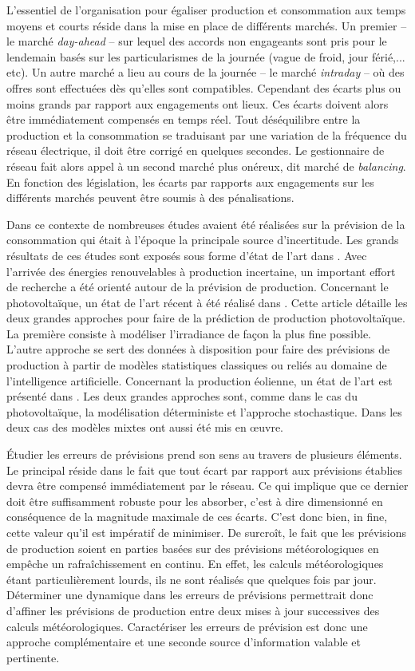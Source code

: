 \documentclass[12pt]{report}
\begin{document}
L'essentiel de l'organisation pour égaliser production et consommation aux temps moyens et courts réside dans la mise en place de différents marchés. Un premier -- le marché \textit{day-ahead} -- sur lequel des accords non engageants sont pris pour le lendemain basés sur les particularismes de la journée (vague de froid, jour férié,... etc). Un autre marché a lieu au cours de la journée -- le marché \textit{intraday} -- où des offres sont effectuées dès qu'elles sont compatibles. Cependant des écarts plus ou moins grands par rapport aux engagements ont lieux. Ces écarts doivent alors être immédiatement compensés en temps réel. Tout déséquilibre entre la production et la consommation se traduisant par une variation de la fréquence du réseau électrique, il doit être corrigé en quelques secondes. Le gestionnaire de réseau fait alors appel à un second marché plus onéreux, dit marché de \textit{balancing}. En fonction des législation, les écarts par rapports aux engagements sur les différents marchés peuvent être soumis à des pénalisations.

Dans ce contexte de nombreuses études avaient été réalisées sur la prévision de la consommation qui était à l'époque la principale source d'incertitude. Les grands résultats de ces études sont exposés sous forme d'état de l'art dans \cite{suganthi_Energy_2012}. Avec l'arrivée des énergies renouvelables à production incertaine, un important effort de recherche a été orienté autour de la prévision de production. Concernant le photovoltaïque, un état de l'art récent à été réalisé dans \cite{antonanzas_review_2016}. Cette article détaille les deux grandes approches pour faire de la prédiction de production photovoltaïque. La première consiste à modéliser l'irradiance de façon la plus fine possible. L'autre approche se sert des données à disposition pour faire des prévisions de production à partir de modèles statistiques classiques ou reliés au domaine de l'intelligence artificielle. Concernant la production éolienne, un état de l'art est présenté dans \cite{jung_current_2014}. Les deux grandes approches sont, comme dans le cas du photovoltaïque, la modélisation déterministe et l'approche stochastique. Dans les deux cas des modèles mixtes ont aussi été mis en œuvre.

Étudier les erreurs de prévisions prend son sens au travers de plusieurs éléments. Le principal réside dans le fait que tout écart par rapport aux prévisions établies devra être compensé immédiatement par le réseau. Ce qui implique que ce dernier doit être suffisamment robuste pour les absorber, c'est à dire dimensionné en conséquence de la magnitude maximale de ces écarts. C'est donc bien, in fine, cette valeur qu'il est impératif de minimiser. De surcroît, le fait que les prévisions de production soient en parties basées sur des prévisions météorologiques en empêche un rafraîchissement en continu. En effet, les calculs météorologiques étant particulièrement lourds, ils ne sont réalisés que quelques fois par jour. Déterminer une dynamique dans les erreurs de prévisions permettrait donc d'affiner les prévisions de production entre deux mises à jour successives des calculs météorologiques. Caractériser les erreurs de prévision est donc une approche complémentaire et une seconde source d'information valable et pertinente.
\end{document}
